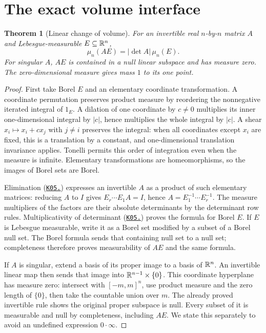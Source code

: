 \documentclass[11pt,a4paper]{book}
\newtheorem{theorem}{Theorem}[chapter]
\theoremstyle{definition}\newtheorem{definition}[theorem]{Definition}
\theoremstyle{remark}\newtheorem{remark}[theorem]{Remark}
\newcommand{\kref}[1]{\hyperref[k:#1]{\texttt{K05.\detokenize{#1}}}}
\begin{document}
\section{The exact volume interface}
\begin{theorem}[Linear change of volume]\label{aux:volume-change}
For an invertible real $n$-by-$n$ matrix $A$ and Lebesgue-measurable $E\subseteq\mathbb R^n$,
\[
 \mu_n(AE)=|\det A|\,\mu_n(E).
\]
For singular $A$, $AE$ is contained in a null linear subspace and has measure zero. The zero-dimensional measure gives mass $1$ to its one point.
\end{theorem}
\begin{proof}
First take Borel $E$ and an elementary coordinate transformation. A coordinate permutation preserves product measure by reordering the nonnegative iterated integral of $1_E$. A dilation of one coordinate by $c\ne0$ multiplies its inner one-dimensional integral by $|c|$, hence multiplies the whole integral by $|c|$. A shear $x_i\mapsto x_i+cx_j$ with $j\ne i$ preserves the integral: when all coordinates except $x_i$ are fixed, this is a translation by a constant, and one-dimensional translation invariance applies. Tonelli permits this order of integration even when the measure is infinite. Elementary transformations are homeomorphisms, so the images of Borel sets are Borel.

Elimination (\kref{01.elimination}) expresses an invertible $A$ as a product of such elementary matrices: reducing $A$ to $I$ gives $E_r\cdots E_1A=I$, hence $A=E_1^{-1}\cdots E_r^{-1}$. The measure multipliers of the factors are their absolute determinants by the determinant row rules. Multiplicativity of determinant (\kref{05.det_product}) proves the formula for Borel $E$. If $E$ is Lebesgue measurable, write it as a Borel set modified by a subset of a Borel null set. The Borel formula sends that containing null set to a null set; completeness therefore proves measurability of $AE$ and the same formula.

If $A$ is singular, extend a basis of its proper image to a basis of $\mathbb R^n$. An invertible linear map then sends that image into $\mathbb R^{n-1}\times\{0\}$. This coordinate hyperplane has measure zero: intersect with $[-m,m]^n$, use product measure and the zero length of $\{0\}$, then take the countable union over $m$. The already proved invertible rule shows the original proper subspace is null. Every subset of it is measurable and null by completeness, including $AE$. We state this separately to avoid an undefined expression $0\cdot\infty$.
\end{proof}
\end{document}
